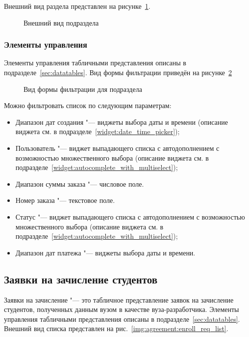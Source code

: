 Внешний вид раздела представлен на рисунке~\ref{agreement:table_payments}.
		\begin{figure}[H]
		\caption{Внешний вид подраздела }
		\label{agreement:table_payments}
		\end{figure}	
		
\subsubsection{Элементы управления}
Элементы управления табличными представления описаны в подразделе~\ref{sec:datatables}. Вид формы фильтрации приведён на рисунке~\ref{agreement:payments_filter_form}
\begin{figure}[H]
	\caption{Вид формы фильтрации для подраздела }
	\label{agreement:payments_filter_form}
\end{figure}

Можно фильтровать список по следующим параметрам:
\begin{itemize}
	\item Диапазон дат создания "--- виджеты выбора даты и времени 
	(описание виджета см. в подразделе~\ref{widget:date_time_picker});
	\item Пользователь "--- виджет выпадающего списка с автодополнением с возможностью множественного выбора 
	(описание виджета см. в подразделе~\ref{widget:autocomplete_with_multiselect});
	\item Диапазон суммы заказа "--- числовое поле.
	\item Номер заказа "--- текстовое поле.
	\item Статус "--- виджет выпадающего списка с автодополнением с возможностью множественного выбора 
	(описание виджета см. в подразделе~\ref{widget:autocomplete_with_multiselect});
	\item Диапазон дат платежа "--- виджеты выбора даты и времени.
\end{itemize}


\subsection{Заявки на зачисление студентов}

Заявки на зачисление "--- это табличное представление заявок на зачисление студентов, 
полученных данным вузом в качестве вуза-разработчика. 
Элементы управления табличными представления описаны в подразделе~\ref{sec:datatables}.
Внешний вид списка представлен на рис.~\ref{img:agreement:enroll_req_list}. 

